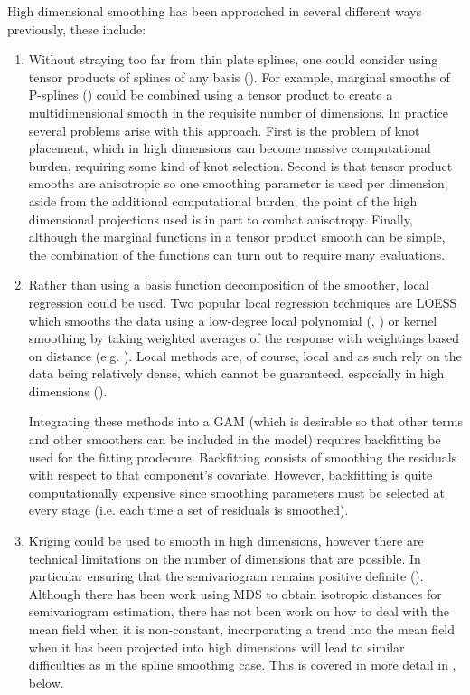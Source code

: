 High dimensional smoothing has been approached in several different ways previously, these include:
\begin{enumerate}
   \item Without straying too far from thin plate splines, one could consider using tensor products of splines of any basis (). For example, marginal smooths of P-splines () could be combined using a tensor product to create a multidimensional smooth in the requisite number of dimensions. In practice several problems arise with this approach. First is the problem of knot placement, which in high dimensions can become massive computational burden, requiring some kind of knot selection. Second is that tensor product smooths are anisotropic so one smoothing parameter is used per dimension, aside from the additional computational burden, the point of the high dimensional projections used is in part to combat anisotropy. Finally, although the marginal functions in a tensor product smooth can be simple, the combination of the functions can turn out to require many evaluations.
   \item Rather than using a basis function decomposition of the smoother, local regression could be used. Two popular local regression techniques are LOESS which smooths the data using a low-degree local polynomial  (\cite{loess1}, \cite{loess2}) or kernel smoothing by taking weighted averages of the response with weightings based on distance (e.g. \cite[pp. 194-200]{elements}). Local methods are, of course, local and as such rely on the data being relatively dense, which cannot be guaranteed, especially in high dimensions (\cite[p. 200]{elements}). 

Integrating these methods into a GAM (which is desirable so that other terms and other smoothers can be included in the model) requires backfitting be used for the fitting prodecure. Backfitting consists of smoothing the residuals with respect to that component's covariate. However, backfitting is quite computationally expensive since smoothing parameters must be selected at every stage (i.e. each time a set of residuals is smoothed).

   \item Kriging could be used to smooth in high dimensions, however there are technical limitations on the number of dimensions that are possible. In particular ensuring that the semivariogram remains positive definite (\cite{boisvert}). Although there has been work using MDS to obtain isotropic distances for semivariogram estimation, there has not been work on how to deal with the mean field when it is non-constant, incorporating a trend into the mean field when it has been projected into high dimensions will lead to similar difficulties as in the spline smoothing case. This is covered in more detail in , below.
\end{enumerate}

